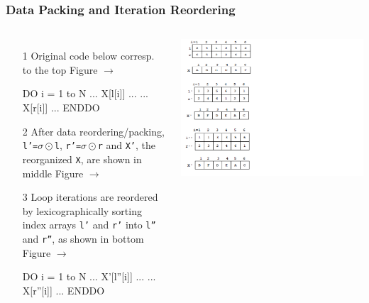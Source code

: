 \documentclass{beamer}
\begin{document}
\begin{frame}[fragile,t]
  \frametitle{Data Packing and Iteration Reordering}

\begin{columns}
\begin{itemize}
\item[1] Original code below corresp.\\
to the top Figure $\rightarrow$
\begin{colorcode}
DO i = 1 to N
  ... X[l[i]] ...
  ... X[r[i]] ...
ENDDO
\end{colorcode}
\smallskip

\item[2] After data reordering/packing, {\tt l'=$\sigma\odot$l},
{\tt r'=$\sigma\odot$r} and {\tt X'}, the reorganized {\tt X},
are shown in middle Figure $\rightarrow$\smallskip

\item[3] Loop iterations are reordered
        by lexicographically sorting index arrays
        {\tt l'} and {\tt r'} into {\tt l''} and {\tt r''},
        as shown in bottom Figure $\rightarrow$
\begin{colorcode}
DO i = 1 to N
  ... X'[l''[i]] ...
  ... X[r''[i]] ...
ENDDO
\end{colorcode}
\end{itemize}
\includegraphics[width=59ex]{ParTeaserFigs/RedorderingDaIt}
\end{columns}

 
\end{frame}
\end{document}
